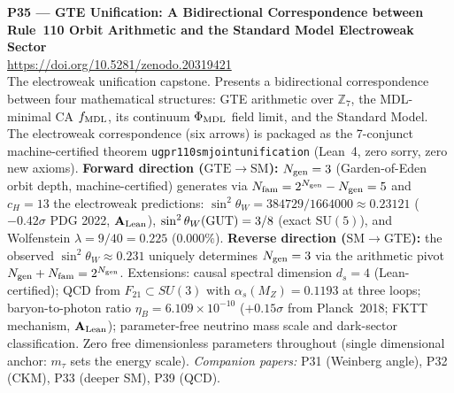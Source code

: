 \documentclass[11pt]{article}
\newcommand{\lean}[1]{%
  \penalty-100
  \begingroup\def\_{{\textunderscore\allowbreak}}\texttt{#1}\endgroup}
\newcommand{\CatAL}{\ensuremath{\textbf{A}_{\rm Lean}}}
\begin{document}
\medskip
\noindent\textbf{P35 — GTE Unification: A Bidirectional Correspondence between
Rule~110 Orbit Arithmetic and the Standard Model Electroweak Sector}~\cite{SpivackGTEUnification}\\
\url{https://doi.org/10.5281/zenodo.20319421}\\
The electroweak unification capstone.  Presents a bidirectional correspondence
between four mathematical structures: GTE arithmetic over $\mathbb{Z}_7$, the
MDL-minimal CA $f_{\rm MDL}$, its continuum $\Phi_{\rm MDL}$ field limit, and the
Standard Model.  The electroweak correspondence (six arrows) is packaged as the
7-conjunct machine-certified theorem \lean{ugp\_r110\_sm\_joint\_unification}
(Lean~4, zero sorry, zero new axioms).
\textbf{Forward direction ($\mathrm{GTE}\to\mathrm{SM}$):} $N_{\rm gen}=3$
(Garden-of-Eden orbit depth, machine-certified) generates via $N_{\rm fam}=2^{N_{\rm gen}}-N_{\rm gen}=5$
and $c_H=13$ the electroweak predictions:
$\sin^2\theta_W = 384729/1664000 \approx 0.23121$ ($-0.42\sigma$ PDG 2022, \CatAL), $\sin^2\theta_W({\rm GUT}) = 3/8$
(exact $\mathrm{SU}(5)$), and Wolfenstein $\lambda = 9/40 = 0.225$ ($0.000\%$).
\textbf{Reverse direction ($\mathrm{SM}\to\mathrm{GTE}$):} the observed $\sin^2\theta_W \approx 0.231$
uniquely determines $N_{\rm gen}=3$ via the arithmetic pivot $N_{\rm gen}+N_{\rm fam}=2^{N_{\rm gen}}$.
Extensions: causal spectral dimension $d_s=4$ (Lean-certified); QCD from $F_{21} \subset SU(3)$
with $\alpha_s(M_Z)=0.1193$ at three loops; baryon-to-photon ratio
$\eta_B = 6.109\times10^{-10}$ ($+0.15\sigma$ from Planck~2018; FKTT mechanism, \CatAL);
parameter-free
neutrino mass scale and dark-sector classification.  Zero free dimensionless parameters
throughout (single dimensional anchor: $m_\tau$ sets the energy scale).
\emph{Companion papers:} P31 (Weinberg angle), P32 (CKM), P33 (deeper SM), P39 (QCD).
\end{document}
